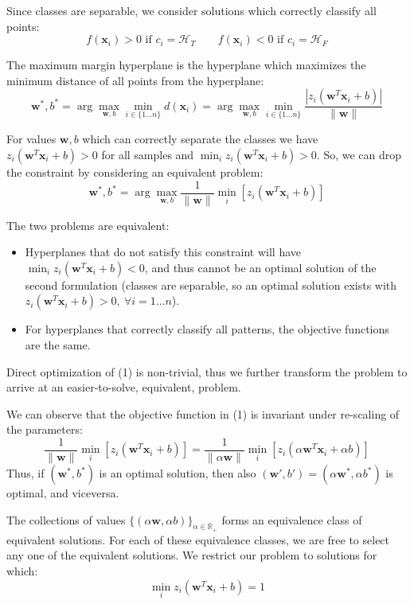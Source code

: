Since classes are separable, we consider solutions which correctly classify all points:
\[
f(\mathbf{x}_i) > 0 \text{ if } c_i = \mathcal{H}_T \qquad f(\mathbf{x}_i) < 0 \text{ if } c_i = \mathcal{H}_F
\]

The maximum margin hyperplane is the hyperplane which maximizes the minimum
distance of all points from the hyperplane:
\[
\mathbf{w}^*, b^* = \arg\max_{\mathbf{w},b} \min_{i \in \{1\ldots n\}} d(\mathbf{x}_i) = \arg\max_{\mathbf{w},b} \min_{i \in \{1\ldots n\}} \frac{|z_i(\mathbf{w}^T \mathbf{x}_i + b)|}{\|\mathbf{w}\|}
\]

For values $\mathbf{w}, b$ which can correctly separate the classes we have
$z_i(\mathbf{w}^T \mathbf{x}_i + b) > 0$ for all samples and
$\min_i z_i(\mathbf{w}^T \mathbf{x}_i + b) > 0$. So, we can drop the constraint by considering
an equivalent problem:
\[
\mathbf{w}^*, b^* = \arg\max_{\mathbf{w},b} \frac{1}{\|\mathbf{w}\|} \min_i \left[ z_i(\mathbf{w}^T \mathbf{x}_i + b) \right] \tag{1}
\]

The two problems are equivalent:
\begin{itemize}
    \item Hyperplanes that do not satisfy this constraint will have $\min_i z_i(\mathbf{w}^T \mathbf{x}_i + b) < 0$, and thus
    cannot be an optimal solution of the second formulation (classes are separable, so
    an optimal solution exists with $z_i(\mathbf{w}^T \mathbf{x}_i + b) > 0,\ \forall i = 1\ldots n$).
    \item For hyperplanes that correctly classify all patterns, the objective functions are the
    same.
\end{itemize}

Direct optimization of (1) is non-trivial, thus we further transform the problem to arrive at an
easier-to-solve, equivalent, problem.

We can observe that the objective function in (1) is invariant under re-scaling of the
parameters:
\[
\frac{1}{\|\mathbf{w}\|} \min_i \left[ z_i(\mathbf{w}^T \mathbf{x}_i + b) \right] = \frac{1}{\|\alpha\mathbf{w}\|} \min_i \left[ z_i(\alpha\mathbf{w}^T \mathbf{x}_i + \alpha b) \right]
\]
Thus, if $(\mathbf{w}^*, b^*)$ is an optimal solution, then also
$(\mathbf{w}', b') = (\alpha\mathbf{w}^*, \alpha b^*)$ is optimal, and
viceversa.

The collections of values $\{(\alpha\mathbf{w}, \alpha b)\}_{\alpha \in \mathbb{R}_+}$ forms an equivalence class of equivalent
solutions. For each of these equivalence classes, we are free to select any one of the
equivalent solutions. We restrict our problem to solutions for which:
\[
\min_i z_i(\mathbf{w}^T \mathbf{x}_i + b) = 1
\]

